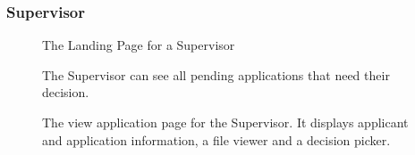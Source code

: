 \documentclass[11pt]{article}
\begin{document}
\subsubsection{Supervisor}
\begin{figure}[H]
	\caption{The Landing Page for a Supervisor}
\end{figure}

\begin{figure}[H]
	\caption{The Supervisor can see all pending applications that need their decision.}
\end{figure}
\begin{figure}[H]
	\caption{The view application page for the Supervisor. It displays applicant and application information, a file viewer and a decision picker.}
\end{figure}
\end{document}
